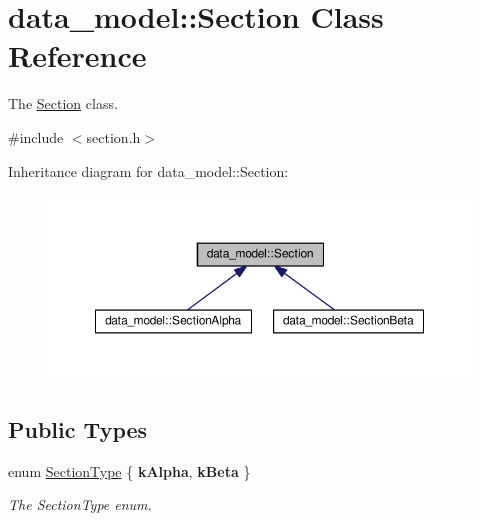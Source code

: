 \hypertarget{classdata__model_1_1_section}{}\section{data\+\_\+model\+:\+:Section Class Reference}
\label{classdata__model_1_1_section}


The \hyperlink{classdata__model_1_1_section}{Section} class.  




{\ttfamily \#include $<$section.\+h$>$}



Inheritance diagram for data\+\_\+model\+:\+:Section\+:
\nopagebreak
\begin{figure}[H]
\begin{center}
\leavevmode
\includegraphics[width=350pt]{classdata__model_1_1_section__inherit__graph}
\end{center}
\end{figure}
\subsection*{Public Types}
\begin{DoxyCompactItemize}
\item 
enum \hyperlink{classdata__model_1_1_section_acba8f1759f6c20b81bed2d4a1178a155}{Section\+Type} \{ {\bfseries k\+Alpha}, 
{\bfseries k\+Beta}
 \}\hypertarget{classdata__model_1_1_section_acba8f1759f6c20b81bed2d4a1178a155}{}\label{classdata__model_1_1_section_acba8f1759f6c20b81bed2d4a1178a155}
\begin{DoxyCompactList}\small\item\em The Section\+Type enum. \end{DoxyCompactList}
\end{DoxyCompactItemize}
